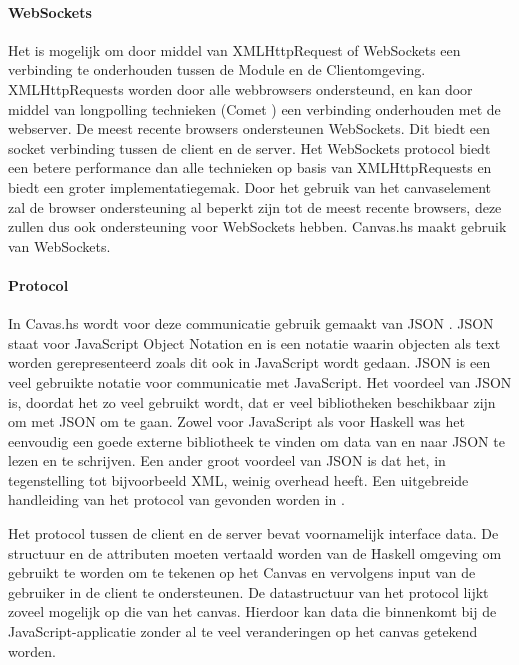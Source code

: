 \paragraph{WebSockets}
Het is mogelijk om door middel van XMLHttpRequest of WebSockets een verbinding te onderhouden tussen de Module en de Clientomgeving. XMLHttpRequests worden door alle webbrowsers ondersteund, en kan door middel van longpolling technieken (Comet \cite{comet2007}) een verbinding onderhouden met de webserver. De meest recente browsers ondersteunen WebSockets. Dit biedt een socket verbinding tussen de client en de server. Het WebSockets protocol biedt een betere performance dan alle technieken op basis van XMLHttpRequests en biedt een groter implementatiegemak. Door het gebruik van het canvaselement zal de browser ondersteuning al beperkt zijn tot de meest recente browsers, deze zullen dus ook ondersteuning voor WebSockets hebben. Canvas.hs maakt gebruik van WebSockets.

\paragraph{Protocol}
In Cavas.hs wordt voor deze communicatie gebruik gemaakt van JSON \cite{JSON2006}. JSON staat voor JavaScript Object Notation en is een notatie waarin objecten als text worden gerepresenteerd zoals dit ook in JavaScript wordt gedaan. JSON is een veel gebruikte notatie voor communicatie met JavaScript. Het voordeel van JSON is, doordat het zo veel gebruikt wordt, dat er veel bibliotheken beschikbaar zijn om met JSON om te gaan. Zowel voor JavaScript als voor Haskell was het eenvoudig een goede externe bibliotheek te vinden om data van en naar JSON te lezen en te schrijven. Een ander groot voordeel van JSON is dat het, in tegenstelling tot bijvoorbeeld XML, weinig overhead heeft. Een uitgebreide handleiding van het protocol van gevonden worden in \cite{Protocol2013}.

Het protocol tussen de client en de server bevat voornamelijk interface data. De structuur en de attributen moeten vertaald worden van de Haskell omgeving om gebruikt te worden om te tekenen op het Canvas en vervolgens input van de gebruiker in de client te ondersteunen. De datastructuur van het protocol lijkt zoveel mogelijk op die van het canvas. Hierdoor kan data die binnenkomt bij de JavaScript-applicatie zonder al te veel veranderingen op het canvas getekend worden.


